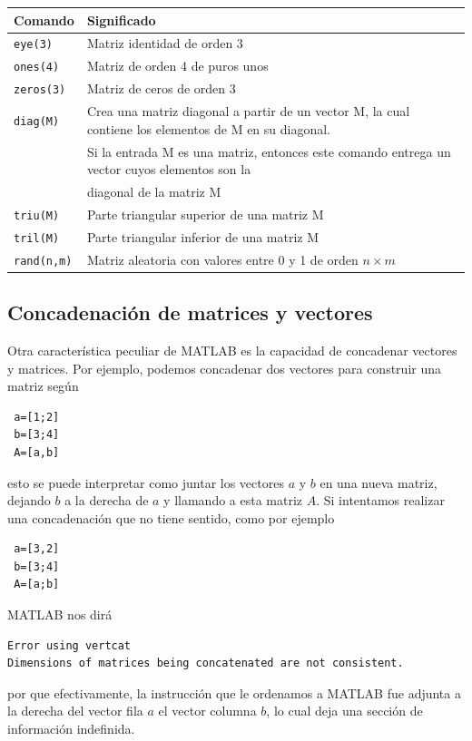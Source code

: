 \documentclass[11pt,legalpaper]{article}
\begin{document}
\begin{center}
\begin{tabular}{l|p{}}
\hline
Comando		& Significado \\
\hline
\texttt{eye(3)}		& Matriz identidad de orden 3\\
\hline
\texttt{ones(4)} 	& Matriz de orden 4 de puros unos\\
\hline
\texttt{zeros(3)} 	& Matriz de ceros de orden 3\\
\hline
\texttt{diag(M)} 	& Crea una matriz diagonal a partir de un vector M,
la cual contiene los elementos de M en su diagonal.\\
& Si la entrada M es una matriz, entonces este comando entrega un vector cuyos elementos son la\\
& diagonal de la matriz M\\
\hline
\texttt{triu(M)}& Parte triangular superior  de una matriz M \\
\hline
\texttt{tril(M)}& Parte triangular inferior de una matriz M\\
\hline
\texttt{rand(n,m)}& Matriz aleatoria con valores entre 0 y 1 de orden $n\times m$
\end{tabular}
\end{center}


\subsection{Concadenaci\'on de matrices y vectores}
Otra caracter\'istica peculiar de MATLAB es la capacidad de concadenar vectores y matrices. Por ejemplo, 
podemos concadenar dos vectores para construir una matriz seg\'un
\begin{verbatim}
 a=[1;2]
 b=[3;4]
 A=[a,b]
\end{verbatim}
esto se puede interpretar como juntar los vectores $a$ y $b$ en una nueva matriz, dejando  $b$ a la derecha de $a$ 
y llamando a esta matriz $A$. Si intentamos realizar una concadenaci\'on que no tiene sentido, como por ejemplo
\begin{verbatim}
 a=[3,2]
 b=[3;4]
 A=[a;b]
\end{verbatim}
MATLAB nos dir\'a 
\begin{verbatim}
Error using vertcat
Dimensions of matrices being concatenated are not consistent.
\end{verbatim}
por que efectivamente, la instrucci\'on que le ordenamos a MATLAB fue adjunta a la derecha del vector fila $a$ 
el vector columna $b$, lo cual deja una secci\'on de informaci\'on indefinida.
\end{document}
